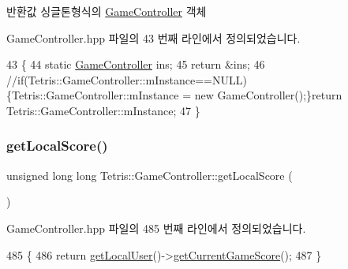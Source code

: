 \begin{DoxyReturn}{반환값}
싱글톤형식의 \hyperlink{class_tetris_1_1_game_controller}{Game\+Controller} 객체 
\end{DoxyReturn}


Game\+Controller.\+hpp 파일의 43 번째 라인에서 정의되었습니다.


\begin{DoxyCode}
43                                                 \{
44                 \textcolor{keyword}{static} \hyperlink{class_tetris_1_1_game_controller}{GameController} ins;
45                 \textcolor{keywordflow}{return} &ins;
46                 \textcolor{comment}{//if(Tetris::GameController::mInstance==NULL)\{Tetris::GameController::mInstance = new
       GameController();\}return Tetris::GameController::mInstance;}
47             \}
\end{DoxyCode}
\mbox{\label{class_tetris_1_1_game_controller_ad88f3362af23d87282ee8ed39394054d}} 
\subsubsection{\texorpdfstring{get\+Local\+Score()}{getLocalScore()}}
{\footnotesize\ttfamily unsigned long long Tetris\+::\+Game\+Controller\+::get\+Local\+Score (\begin{DoxyParamCaption}{ }\end{DoxyParamCaption})\hspace{0.3cm}{\ttfamily [inline]}}



Game\+Controller.\+hpp 파일의 485 번째 라인에서 정의되었습니다.


\begin{DoxyCode}
485                                           \{
486             \textcolor{keywordflow}{return} \hyperlink{class_tetris_1_1_game_controller_abc67d4b309ce2886b43a3b4e0af22abc}{getLocalUser}()->\hyperlink{class_tetris_1_1_users_1_1_game_user_a93bde8123ee0dc9333d62a44b904023c}{getCurrentGameScore}();
487         \}
\end{DoxyCode}
\mbox{\label{class_tetris_1_1_game_controller_abc67d4b309ce2886b43a3b4e0af22abc}} 
